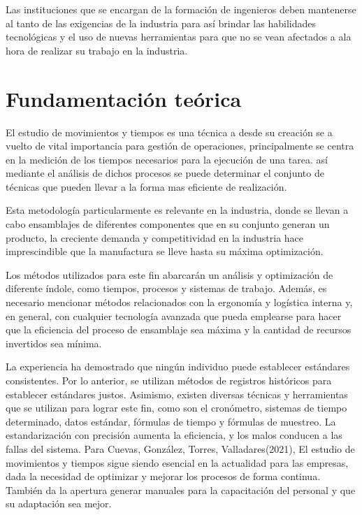     Las instituciones que se encargan de la formación de ingenieros deben mantenerse al tanto de las exigencias de la industria para así brindar las habilidades tecnológicas y el uso de nuevas herramientas para que no se vean afectados a ala hora de realizar su trabajo en la industria.
    
    \section{Fundamentación teórica}
    El estudio de movimientos y tiempos es una técnica a desde su creación se a vuelto de vital importancia para gestión de operaciones, principalmente se centra en la medición de los tiempos necesarios para la ejecución de una tarea. así mediante el análisis de dichos procesos se puede determinar el conjunto de técnicas que pueden llevar a la forma mas eficiente de realización.
    
    Esta metodología particularmente es relevante en la industria, donde se llevan a cabo ensamblajes de diferentes componentes que en su conjunto generan un producto, la creciente demanda y competitividad en la industria hace imprescindible que la manufactura se lleve hasta su máxima optimización.
    
    Los métodos utilizados para este fin abarcarán un análisis y optimización de diferente índole, como tiempos, procesos y sistemas de trabajo. Además, es necesario mencionar métodos relacionados con la ergonomía y logística interna y, en general, con cualquier tecnología avanzada que pueda emplearse para hacer que la eficiencia del proceso de ensamblaje sea máxima y la cantidad de recursos invertidos sea mínima.
    
     La experiencia ha demostrado
    que ningún individuo puede establecer estándares consistentes.
    Por lo anterior, se utilizan métodos de registros históricos para
    establecer estándares justos. Asimismo, existen diversas técnicas y
    herramientas que se utilizan para lograr este fin, como son el
    cronómetro, sistemas de tiempo determinado, datos estándar,
    fórmulas de tiempo y fórmulas de muestreo. La estandarización con
    precisión aumenta la eficiencia, y los malos conducen a las fallas del
    sistema.
    Para Cuevas, González, Torres, Valladares(2021), El estudio de movimientos y tiempos sigue siendo esencial en la actualidad para las empresas, dada la necesidad de optimizar y mejorar los procesos de forma continua. También da la apertura generar manuales para la capacitación del personal y que su adaptación sea mejor.\cite{REF2}
    
